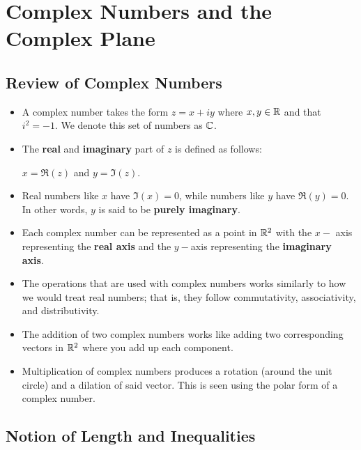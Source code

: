 \documentclass[11pt,a4paper]{book}
\begin{document}
\section{Complex Numbers and the Complex Plane}

\subsection{Review of Complex Numbers}

\begin{itemize}
    \item A complex number takes the form \( z = x + iy \) where \( x,y \in \mathbb{R}  \) and that \( i^{2} = -1   \). We denote this set of numbers as \( \mathbb{C} \).
    \item The \textbf{real} and \textbf{imaginary} part of \( z  \) is defined as follows:
        \begin{center}
            \( x = \Re(z) \) and \( y = \Im(z) \).
        \end{center}
    \item Real numbers like \( x  \) have \( \Im(x) = 0  \), while numbers like \(  y \) have \( \Re(y) = 0  \). In other words, \( y  \) is said to be \textbf{purely imaginary}.
    \item Each complex number can be represented as a point in \( \mathbb{R}^{2} \) with the \(  x-  \) axis representing the \textbf{real axis} and the \( y- \)axis representing the \textbf{imaginary axis}.
    \item The operations that are used with complex numbers works similarly to how we would treat real numbers; that is, they follow commutativity, associativity, and distributivity. 
    \item The addition of two complex numbers works like adding two corresponding vectors in \( \mathbb{R}^{2} \) where you add up each component.
    \item Multiplication of complex numbers produces a rotation (around the unit circle) and a dilation of said vector. This is seen using the polar form of a complex number.
\end{itemize}

\subsection{Notion of Length and Inequalities}
\end{document}
